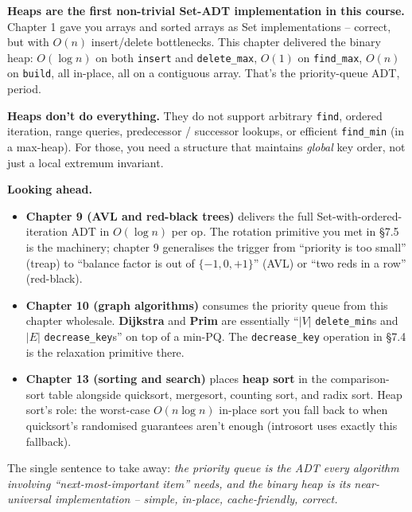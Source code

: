 \documentclass[11pt]{article}
\begin{document}
\begin{ideabox}
\textbf{Heaps are the first non-trivial Set-ADT implementation in
this course.} Chapter 1 gave you arrays and sorted arrays as Set
implementations -- correct, but with $O(n)$ insert/delete bottlenecks.
This chapter delivered the binary heap: $O(\log n)$ on both
\texttt{insert} and \texttt{delete\_max}, $O(1)$ on \texttt{find\_max},
$O(n)$ on \texttt{build}, all in-place, all on a contiguous array.
That's the priority-queue ADT, period.

\textbf{Heaps don't do everything.} They do not support arbitrary
\texttt{find}, ordered iteration, range queries, predecessor /
successor lookups, or efficient \texttt{find\_min} (in a max-heap).
For those, you need a structure that maintains \emph{global} key
order, not just a local extremum invariant.

\textbf{Looking ahead.}
\begin{itemize}[leftmargin=*]
    \item \textbf{Chapter 9 (AVL and red-black trees)} delivers the
          full Set-with-ordered-iteration ADT in $O(\log n)$ per
          op. The rotation primitive you met in \S7.5 is the
          machinery; chapter 9 generalises the trigger from
          ``priority is too small'' (treap) to ``balance factor is
          out of $\{-1, 0, +1\}$'' (AVL) or ``two reds in a row''
          (red-black).
    \item \textbf{Chapter 10 (graph algorithms)} consumes the
          priority queue from this chapter wholesale.
          \textbf{Dijkstra} and \textbf{Prim} are essentially
          ``$|V|$ \texttt{delete\_min}s and $|E|$
          \texttt{decrease\_key}s'' on top of a min-PQ. The
          \texttt{decrease\_key} operation in \S7.4 is the
          relaxation primitive there.
    \item \textbf{Chapter 13 (sorting and search)} places
          \textbf{heap sort} in the comparison-sort table alongside
          quicksort, mergesort, counting sort, and radix sort. Heap
          sort's role: the worst-case $O(n \log n)$ in-place sort
          you fall back to when quicksort's randomised guarantees
          aren't enough (introsort uses exactly this fallback).
\end{itemize}

The single sentence to take away: \emph{the priority queue is the
ADT every algorithm involving ``next-most-important item'' needs,
and the binary heap is its near-universal implementation -- simple,
in-place, cache-friendly, correct.}
\end{ideabox}
\end{document}
